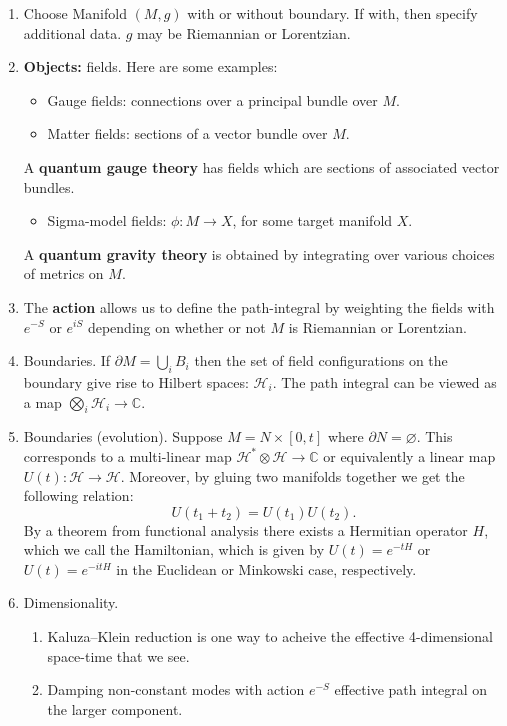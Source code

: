 \documentclass{report}
\theoremstyle{plain}
\theoremstyle{definition}
\theoremstyle{remark}
\newcommand{\di}{\partial}
\newcommand{\bC}{\mathbb{C}}
\newcommand{\mc}{\mathcal}
\newcommand{\ten}{\otimes}
\begin{document}
\begin{enumerate}
    \item Choose Manifold $(M,g)$ with or without boundary. If with, then
        specify additional data. $g$ may be Riemannian or Lorentzian.
    \item \textbf{Objects:} fields. Here are some examples:
        \begin{itemize}
        \item Gauge fields: connections over a principal bundle over $M$.
        \item Matter fields: sections of a vector bundle over $M$.
        \end{itemize}
        A \textbf{quantum gauge theory} has fields which are sections of
        associated vector bundles.
        \begin{itemize}
        \item Sigma-model fields: $\phi\colon M \to X$, for some target
            manifold $X$.
        \end{itemize}
        A \textbf{quantum gravity theory} is obtained by integrating over
        various choices of metrics on $M$.
    \item The \textbf{action} allows us to define the path-integral by
        weighting the fields with $e^{-S}$ or $e^{iS}$ depending on whether
        or not $M$ is Riemannian or Lorentzian.
    \item Boundaries. If $\di M = \bigcup_i B_i$ then the set of field
        configurations on the boundary give rise to Hilbert spaces: $\mc
        H_i$. 
        The path integral can be viewed as a map $\bigotimes_i\mc H_i\to
        \bC$.
    \item Boundaries (evolution).
        Suppose $M=N\times [0,t]$ where $\di N = \varnothing$.
        This corresponds to a multi-linear map $\mc H^*\ten\mc H\to\bC$ or
        equivalently a linear map $U(t):\mc H\to \mc H$. Moreover, by
        gluing two manifolds together we get the following relation:
        \[ U(t_1+t_2)=U(t_1)U(t_2).\] By a theorem from functional analysis
        there exists a Hermitian operator $H$, which we call the
        Hamiltonian, which is given by $U(t) = e^{-tH}$ or $U(t) =
        e^{-itH}$ in the Euclidean or Minkowski case, respectively.
    \item Dimensionality.
        \begin{enumerate}
            \item Kaluza--Klein reduction is one way to acheive the
                effective 4-dimensional space-time that we see.
            \item Damping non-constant modes with action $e^{-S}$ effective
                path integral on the larger component.


\end{enumerate}
\end{enumerate}
\end{document}
